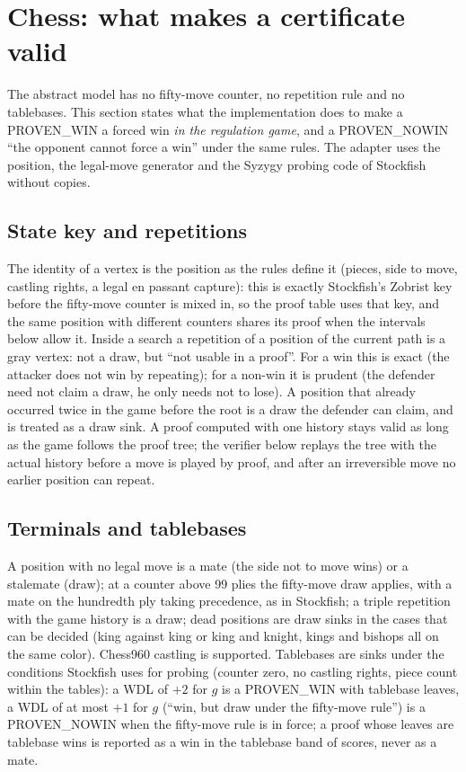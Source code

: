 \documentclass{article}
\theoremstyle{plain}
\theoremstyle{definition}
\theoremstyle{remark}
\newcommand{\PW}{\textsf{PROVEN\_WIN}}
\newcommand{\PN}{\textsf{PROVEN\_NOWIN}}
\begin{document}
\section{Chess: what makes a certificate valid}\label{sec:chess}

The abstract model has no fifty-move counter, no repetition rule and no tablebases. This section states what the implementation does to make a \PW{} a forced win \emph{in the regulation game}, and a \PN{} ``the opponent cannot force a win'' under the same rules. The adapter uses the position, the legal-move generator and the Syzygy probing code \cite{syzygy} of Stockfish without copies.

\subsection{State key and repetitions}

The identity of a vertex is the position as the rules define it (pieces, side to move, castling rights, a legal en passant capture): this is exactly Stockfish's Zobrist key before the fifty-move counter is mixed in, so the proof table uses that key, and the same position with different counters shares its proof when the intervals below allow it. Inside a search a repetition of a position of the current path is a gray vertex: not a draw, but ``not usable in a proof''. For a win this is exact (the attacker does not win by repeating); for a non-win it is prudent (the defender need not claim a draw, he only needs not to lose). A position that already occurred twice in the game before the root is a draw the defender can claim, and is treated as a draw sink. A proof computed with one history stays valid as long as the game follows the proof tree; the verifier below replays the tree with the actual history before a move is played by proof, and after an irreversible move no earlier position can repeat.

\subsection{Terminals and tablebases}

A position with no legal move is a mate (the side not to move wins) or a stalemate (draw); at a counter above 99 plies the fifty-move draw applies, with a mate on the hundredth ply taking precedence, as in Stockfish; a triple repetition with the game history is a draw; dead positions are draw sinks in the cases that can be decided (king against king or king and knight, kings and bishops all on the same color). Chess960 castling is supported. Tablebases are sinks under the conditions Stockfish uses for probing (counter zero, no castling rights, piece count within the tables): a WDL of $+2$ for $g$ is a \PW{} with tablebase leaves, a WDL of at most $+1$ for $g$ (``win, but draw under the fifty-move rule'') is a \PN{} when the fifty-move rule is in force; a proof whose leaves are tablebase wins is reported as a win in the tablebase band of scores, never as a mate.
\end{document}
